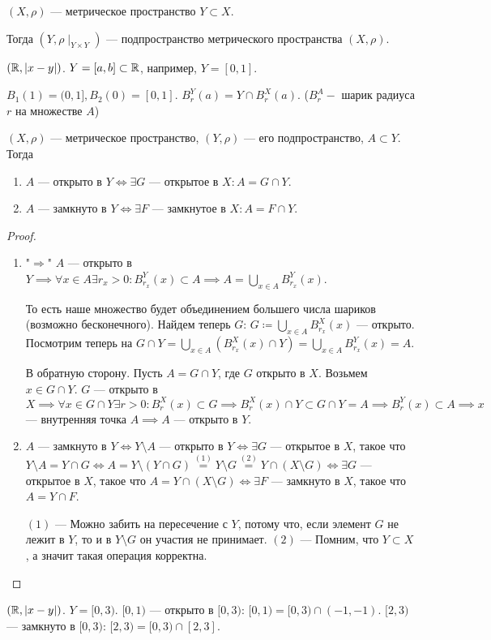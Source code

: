 
\begin{definition}
     $(X, \rho)$ --- метрическое пространство  $Y \subset X$.

     Тогда  $(Y, \rho \mid_{Y \times Y})$ --- подпространство метрического пространства  $(X, \rho)$.
\end{definition}
\begin{example}
     $(\mathbb{R}, |x-y|)$.  $Y=[a, b] \subset \mathbb{R}$, например, $Y=[0, 1]$.

      $B_1(1) = (0, 1], B_2(0) = [0, 1]$.  $B_r^Y(a) = Y \cap B_r^X(a)$. ($B^A_r -$ шарик радиуса $r$ на множестве $A$)
\end{example}
\begin{theorem}
     $(X, \rho)$ --- метрическое пространство,  $(Y, \rho)$ --- его подпространство,  $A \subset Y$. Тогда
      \begin{enumerate}
          \item $A$ --- открыто в  $Y \iff \exists G$ --- открытое в  $X\!: A = G \cap Y$. 
          \item $A$ --- замкнуто в  $Y \iff \exists F$ --- замкнутое в  $X\!: A = F \cap Y$.
     \end{enumerate}
\end{theorem}
\begin{proof}
     \slashn
     \begin{enumerate}
         \item "$\Rightarrow$" $A$ --- открыто в  $Y \implies \forall x \in A \exists r_x > 0 \!: B_{r_x}^Y(x) \subset A \implies A = \bigcup\limits_{x \in A}B_{r_x}^Y(x)$.

             То есть наше множество будет объединением большего числа шариков (возможно бесконечного). Найдем теперь  $G$:  $G \coloneqq \bigcup\limits_{x \in A} B_{r_x}^X(x)$ --- открыто. Посмотрим теперь на  $G \cap Y = \bigcup\limits_{x \in A}(B_{r_x}^X(x) \cap Y) = \bigcup\limits_{x \in A}B_{r_x}^Y(x) = A$.

         В обратную сторону. Пусть $A = G \cap Y$, где  $G$ открыто в  $X$. Возьмем  $x \in G \cap Y$.  $G$ --- открыто в  $X \implies \forall x \in G \cap Y \exists r > 0\!: B_r^X(x) \subset G \implies B_r^X(x) \cap Y \subset G \cap Y = A \implies B_r^Y(x) \subset A \implies x$ --- внутренняя точка $A \implies A$ --- открыто в  $Y$. 

         \item $A$ --- замкнуто в $Y \iff Y \setminus A$ --- открыто в  $Y \iff \exists G$ --- открытое в  $X$, такое что  $Y \setminus A = Y \cap G \iff A = Y \setminus (Y \cap G) \overset{(1)}{=} Y \setminus G \overset{(2)}{=} Y \cap (X \setminus G) \iff \exists G$ --- открытое в  $X$, такое что  $A = Y \cap (X \setminus G) \iff \exists F$ --- замкнуто в  $X$, такое что  $A = Y \cap F$.

             $(1)$ --- Можно забить на пересечение с  $Y$, потому что, если элемент  $G$ не лежит в $Y$, то и в $Y \setminus G$ он участия не принимает.  $(2)$ --- Помним, что  $Y \subset X$, а значит такая операция корректна.
     \end{enumerate}
\end{proof}
\begin{example}
     $(\mathbb{R}, |x-y|)$.  $Y = [0, 3)$.  $[0, 1)$ --- открыто в  $[0, 3)$:  $[0, 1) = [0, 3) \cap (-1, -1)$.  $[2, 3)$ --- замкнуто в  $[0, 3)$:  $[2, 3) = [0, 3) \cap [2, 3]$.
\end{example}
 
